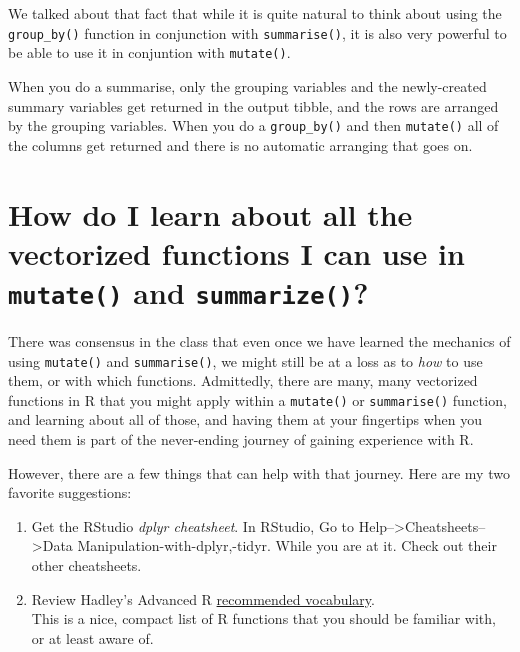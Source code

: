 \documentclass[]{book}
\providecommand{\tightlist}{%
  \setlength{\itemsep}{0pt}\setlength{\parskip}{0pt}}
\theoremstyle{definition}
\theoremstyle{definition}
\theoremstyle{remark}
\begin{document}
We talked about that fact that while it is quite natural to think about
using the \texttt{group\_by()} function in conjunction with
\texttt{summarise()}, it is also very powerful to be able to use it in
conjuntion with \texttt{mutate()}.

When you do a summarise, only the grouping variables and the
newly-created summary variables get returned in the output tibble, and
the rows are arranged by the grouping variables. When you do a
\texttt{group\_by()} and then \texttt{mutate()} all of the columns get
returned and there is no automatic arranging that goes on.

\section{\texorpdfstring{How do I learn about all the vectorized
functions I can use in \texttt{mutate()} and
\texttt{summarize()}?}{How do I learn about all the vectorized functions I can use in mutate() and summarize()?}}\label{how-do-i-learn-about-all-the-vectorized-functions-i-can-use-in-mutate-and-summarize}

There was consensus in the class that even once we have learned the
mechanics of using \texttt{mutate()} and \texttt{summarise()}, we might
still be at a loss as to \emph{how} to use them, or with which
functions. Admittedly, there are many, many vectorized functions in R
that you might apply within a \texttt{mutate()} or \texttt{summarise()}
function, and learning about all of those, and having them at your
fingertips when you need them is part of the never-ending journey of
gaining experience with R.

However, there are a few things that can help with that journey. Here
are my two favorite suggestions:

\begin{enumerate}
\def\labelenumi{\arabic{enumi}.}
\tightlist
\item
  Get the RStudio \emph{dplyr cheatsheet}. In RStudio, Go to
  Help--\textgreater{}Cheatsheets--\textgreater{}Data
  Manipulation-with-dplyr,-tidyr. While you are at it. Check out their
  other cheatsheets.
\item
  Review Hadley's Advanced R
  \href{http://adv-r.had.co.nz/Vocabulary.html}{recommended
  vocabulary}.\\
  This is a nice, compact list of R functions that you should be
  familiar with, or at least aware of.
\end{enumerate}
\end{document}

